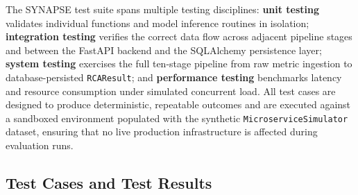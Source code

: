 \hspace*{0.3in} The SYNAPSE test suite spans multiple testing disciplines: \textbf{unit testing} validates individual functions and model inference routines in isolation; \textbf{integration testing} verifies the correct data flow across adjacent pipeline stages and between the FastAPI backend and the SQLAlchemy persistence layer; \textbf{system testing} exercises the full ten-stage pipeline from raw metric ingestion to database-persisted \texttt{RCAResult}; and \textbf{performance testing} benchmarks latency and resource consumption under simulated concurrent load. All test cases are designed to produce deterministic, repeatable outcomes and are executed against a sandboxed environment populated with the synthetic \texttt{MicroserviceSimulator} dataset, ensuring that no live production infrastructure is affected during evaluation runs.

\subsection{Test Cases and Test Results}

